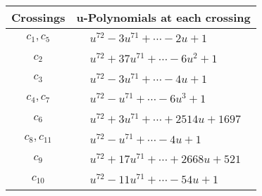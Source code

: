 \documentclass[1p]{elsarticle_modified}
\theoremstyle{definition}
\begin{document}
\begin{tabular}{m{50pt}|m{274pt}}
Crossings & \hspace{64pt}u-Polynomials at each crossing \\
\hline $$\begin{aligned}c_{1},c_{5}\end{aligned}$$&$\begin{aligned}
&u^{72}-3 u^{71}+\cdots-2 u+1
\end{aligned}$\\
\hline $$\begin{aligned}c_{2}\end{aligned}$$&$\begin{aligned}
&u^{72}+37 u^{71}+\cdots-6 u^2+1
\end{aligned}$\\
\hline $$\begin{aligned}c_{3}\end{aligned}$$&$\begin{aligned}
&u^{72}-3 u^{71}+\cdots-4 u+1
\end{aligned}$\\
\hline $$\begin{aligned}c_{4},c_{7}\end{aligned}$$&$\begin{aligned}
&u^{72}- u^{71}+\cdots-6 u^3+1
\end{aligned}$\\
\hline $$\begin{aligned}c_{6}\end{aligned}$$&$\begin{aligned}
&u^{72}+3 u^{71}+\cdots+2514 u+1697
\end{aligned}$\\
\hline $$\begin{aligned}c_{8},c_{11}\end{aligned}$$&$\begin{aligned}
&u^{72}- u^{71}+\cdots-4 u+1
\end{aligned}$\\
\hline $$\begin{aligned}c_{9}\end{aligned}$$&$\begin{aligned}
&u^{72}+17 u^{71}+\cdots+2668 u+521
\end{aligned}$\\
\hline $$\begin{aligned}c_{10}\end{aligned}$$&$\begin{aligned}
&u^{72}-11 u^{71}+\cdots-54 u+1
\end{aligned}$\\
\hline
\end{tabular}\\~\\
\end{document}
